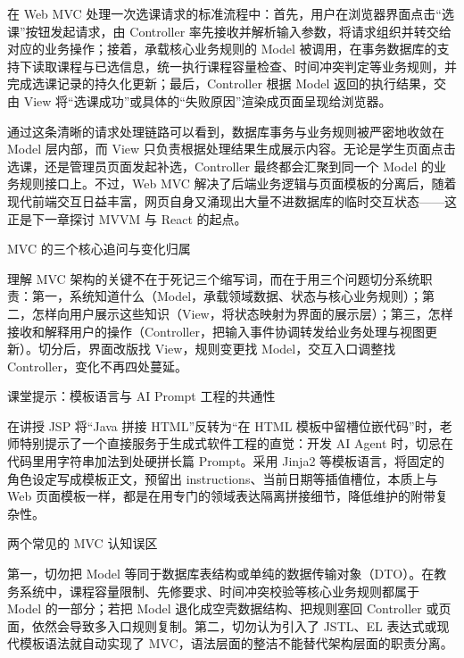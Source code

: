 \documentclass[UTF8,a4paper,11pt,fontset=fandol]{ctexart}
\begin{document}
在 Web MVC 处理一次选课请求的标准流程中：首先，用户在浏览器界面点击“选课”按钮发起请求，由 Controller 率先接收并解析输入参数，将请求组织并转交给对应的业务操作；接着，承载核心业务规则的 Model 被调用，在事务数据库的支持下读取课程与已选信息，统一执行课程容量检查、时间冲突判定等业务规则，并完成选课记录的持久化更新；最后，Controller 根据 Model 返回的执行结果，交由 View 将“选课成功”或具体的“失败原因”渲染成页面呈现给浏览器。

通过这条清晰的请求处理链路可以看到，数据库事务与业务规则被严密地收敛在 Model 层内部，而 View 只负责根据处理结果生成展示内容。无论是学生页面点击选课，还是管理员页面发起补选，Controller 最终都会汇聚到同一个 Model 的业务规则接口上。不过，Web MVC 解决了后端业务逻辑与页面模板的分离后，随着现代前端交互日益丰富，网页自身又涌现出大量不进数据库的临时交互状态——这正是下一章探讨 MVVM 与 React 的起点。

\begin{importantbox}{MVC 的三个核心追问与变化归属}

理解 MVC 架构的关键不在于死记三个缩写词，而在于用三个问题切分系统职责：第一，系统知道什么（Model，承载领域数据、状态与核心业务规则）；第二，怎样向用户展示这些知识（View，将状态映射为界面的展示层）；第三，怎样接收和解释用户的操作（Controller，把输入事件协调转发给业务处理与视图更新）。切分后，界面改版找 View，规则变更找 Model，交互入口调整找 Controller，变化不再四处蔓延。

\end{importantbox}

\begin{knowledgebox}{课堂提示：模板语言与 AI Prompt 工程的共通性}

在讲授 JSP 将“Java 拼接 HTML”反转为“在 HTML 模板中留槽位嵌代码”时，老师特别提示了一个直接服务于生成式软件工程的直觉：开发 AI Agent 时，切忌在代码里用字符串加法到处硬拼长篇 Prompt。采用 Jinja2 等模板语言，将固定的角色设定写成模板正文，预留出 instructions、当前日期等插值槽位，本质上与 Web 页面模板一样，都是在用专门的领域表达隔离拼接细节，降低维护的附带复杂性。

\end{knowledgebox}

\begin{warningbox}{两个常见的 MVC 认知误区}

第一，切勿把 Model 等同于数据库表结构或单纯的数据传输对象（DTO）。在教务系统中，课程容量限制、先修要求、时间冲突校验等核心业务规则都属于 Model 的一部分；若把 Model 退化成空壳数据结构、把规则塞回 Controller 或页面，依然会导致多入口规则复制。第二，切勿认为引入了 JSTL、EL 表达式或现代模板语法就自动实现了 MVC，语法层面的整洁不能替代架构层面的职责分离。

\end{warningbox}
\end{document}
